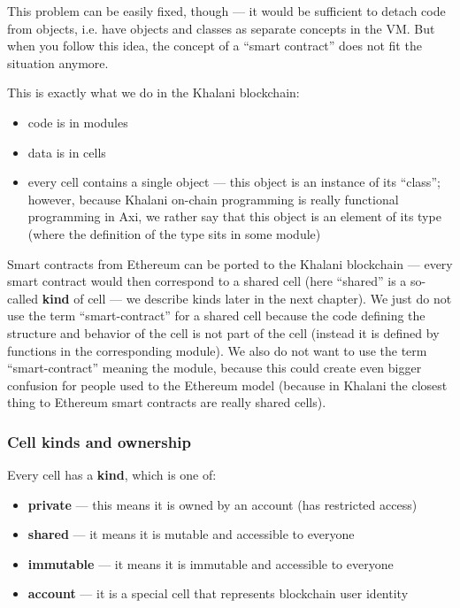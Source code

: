 \documentclass[a4paper]{article}
\begin{document}
This problem can be easily fixed, though --- it would be sufficient to detach code from objects, i.e. have objects and classes as separate concepts in the VM. But when you follow this idea, the concept of a ``smart contract'' does not fit the situation anymore.

This is exactly what we do in the Khalani blockchain:

\begin{itemize}
  \item code is in modules
  \item data is in cells
  \item every cell contains a single object --- this object is an instance of its ``class''; however, because Khalani on-chain programming is really functional programming in Axi, we rather say that this object is an element of its type (where the definition of the type sits in some module)
\end{itemize}

Smart contracts from Ethereum can be ported to the Khalani blockchain --- every smart contract would then correspond to a shared cell (here ``shared'' is a so-called \textbf{kind} of cell --- we describe kinds later in the next chapter). We just do not use the term ``smart-contract'' for a shared cell because the code defining the structure and behavior of the cell is not part of the cell (instead it is defined by functions in the corresponding module). We also do not want to use the term ``smart-contract'' meaning the module, because this could create even bigger confusion for people used to the Ethereum model (because in Khalani the closest thing to Ethereum smart contracts are really shared cells).

\subsubsection{Cell kinds and ownership}

Every cell has a \textbf{kind}, which is one of:

\begin{itemize}
  \item \textbf{private} --- this means it is owned by an account (has restricted access)
  \item \textbf{shared} --- it means it is mutable and accessible to everyone
  \item \textbf{immutable} --- it means it is immutable and accessible to everyone
  \item \textbf{account} --- it is a special cell that represents blockchain user identity
\end{itemize}
\end{document}
